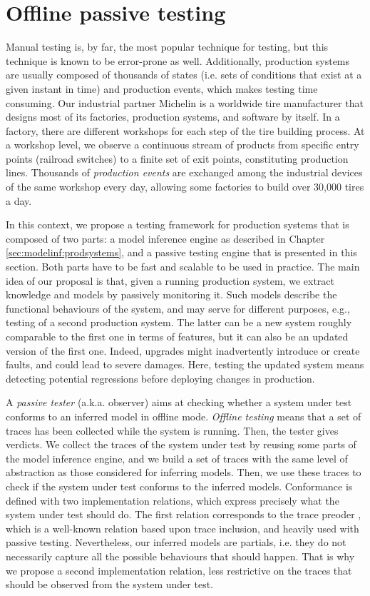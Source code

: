 \section{Offline passive testing}
\label{sec:testing:offpassive}

Manual testing is, by far, the most popular technique for
testing, but this technique is known to be error-prone as well.
Additionally, production systems are usually composed of
thousands of states (i.e. sets of conditions that exist at a
given instant in time) and production events, which makes
testing time consuming. Our industrial partner Michelin is a
worldwide tire manufacturer that designs most of its factories,
production systems, and software by itself. In a factory, there
are different workshops for each step of the tire building
process. At a workshop level, we observe a continuous stream of
products from specific entry points (railroad switches) to a
finite set of exit points, constituting production lines.
Thousands of \emph{production events} are exchanged among the
industrial devices of the same workshop every day, allowing some
factories to build over 30,000 tires a day.

In this context, we propose a testing framework for production
systems that is composed of two parts: a model inference engine
as described in Chapter \ref{sec:modelinf:prodsystems}, and a
passive testing engine that is presented in this section.
Both parts have to be fast and scalable to be used in practice.
The main idea of our proposal is that, given a running production
system, we extract knowledge and models by passively monitoring
it. Such models describe the functional behaviours of the system,
and may serve for different purposes, e.g., testing of a second
production system. The latter can be a new system roughly
comparable to the first one in terms of features, but it can also
be an updated version of the first one. Indeed, upgrades might
inadvertently introduce or create faults, and could lead to
severe damages. Here, testing the updated system means detecting
potential regressions before deploying changes in production.

A \textit{passive tester} (a.k.a. observer) aims at checking
whether a system under test conforms to an inferred model in
offline mode. \textit{Offline testing} means that a set of
traces has been collected while the system is running. Then, the
tester gives verdicts.
We collect the traces of the system under test by reusing some
parts of the model inference engine, and we build a set of traces
with the same level of abstraction as those considered for
inferring models. Then, we use these traces to check if the
system under test conforms to the inferred models.  Conformance
is defined with two implementation relations, which express
precisely what the system under test should do. The first
relation corresponds to the trace preoder \cite{DNH84}, which is
a well-known relation based upon trace inclusion, and heavily
used with passive testing.  Nevertheless, our inferred models are
partials, i.e.  they do not necessarily capture all the possible
behaviours that should happen. That is why we propose a second
implementation relation, less restrictive on the traces that
should be observed from the system under test.

